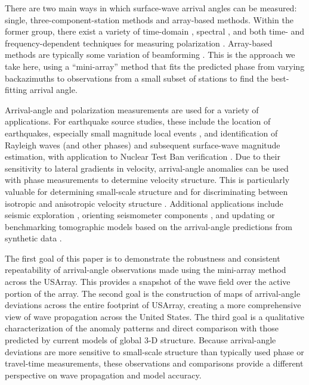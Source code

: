 \documentclass[12pt,oneside]{book}
\begin{document}
There are two main ways in which surface-wave arrival angles can be measured: single, three-component-station methods and array-based methods. Within the former group, there exist a variety of time-domain \citep[e.g.,][]{Flinn1965,MontalbettiKanasewich1970,Vidale1986,Jacksonetal1991,Larson2002}, spectral \citep[e.g.,][]{Lerner-Lam1989,Laske1994}, and both time- and frequency-dependent techniques for measuring polarization \citep[e.g.,][]{Jurkevics1988,Paulssenetal1990}. Array-based methods are typically some variation of beamforming \citep[e.g.,][]{LevshinBerteussen1979,ZywickiRix2005,Tanimoto2007,DeCacquerayetal2011}. This is the approach we take here, using a ``mini-array'' method that fits the predicted phase from varying backazimuths to observations from a small subset of stations to find the best-fitting arrival angle.

Arrival-angle and polarization measurements are used for a variety of applications. For earthquake source studies, these include the location of earthquakes, especially small magnitude local events \citep[e.g.,][]{Ruudetal1988,BakerStevens2004}, and identification of Rayleigh waves (and other phases) and subsequent surface-wave magnitude estimation, with application to Nuclear Test Ban verification \citep[e.g.,][]{Selby2001}. Due to their sensitivity to lateral gradients in velocity, arrival-angle anomalies can be used with phase measurements to determine velocity structure. This is particularly valuable for determining small-scale structure \citep[e.g.,][]{Laske1995,LaskeMasters1996,Yoshizawaetal1999} and for discriminating between isotropic and anisotropic velocity structure \citep[e.g.,][]{Grunewald1988,LaskeMasters1998,Larson1998}. Additional applications include seismic exploration \citep[e.g.,][]{Takahashi1995}, orienting seismometer components \citep[e.g.,][]{Laske1995,Larson2002,EkstromBusby2008}, and updating or benchmarking tomographic models based on the arrival-angle predictions from synthetic data \citep[e.g.,][]{Larson2002,Jietal2005}.

The first goal of this paper is to demonstrate the robustness and consistent repeatability of arrival-angle observations made using the mini-array method across the USArray. This provides a snapshot of the wave field over the active portion of the array. The second goal is the construction of maps of arrival-angle deviations across the entire footprint of USArray, creating a more comprehensive view of wave propagation across the United States. The third goal is a qualitative characterization of the anomaly patterns and direct comparison with those predicted by current models of global 3\nobreakdash-D structure. Because arrival-angle deviations are more sensitive to small-scale structure than typically used phase or travel-time measurements, these observations and comparisons provide a different perspective on wave propagation and model accuracy. 
\end{document}
